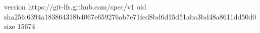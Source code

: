 version https://git-lfs.github.com/spec/v1
oid sha256:6394a183864318b4067e659276ab7e71fcd8bd6d15d51aba3bd48a8611dd50d0
size 15674
